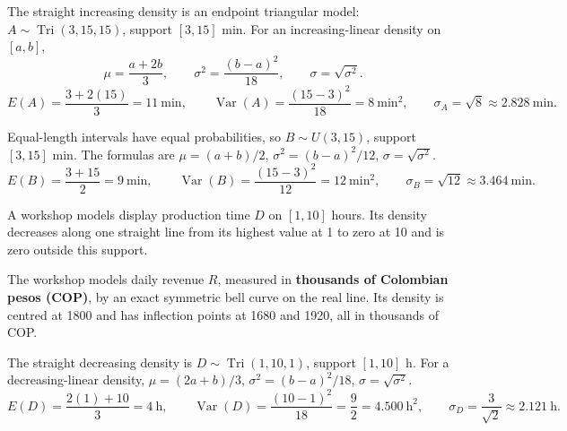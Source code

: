 
The straight increasing density is an endpoint triangular model:
$A\sim\operatorname{Tri}(3,15,15)$, support $[3,15]$ min.
For an increasing-linear density on $[a,b]$,
\[\mu=\frac{a+2b}{3},\qquad \sigma^2=\frac{(b-a)^2}{18},\qquad\sigma=\sqrt{\sigma^2}.\]
\[E(A)=\frac{3+2(15)}3=11\ \text{min},\qquad
\operatorname{Var}(A)=\frac{(15-3)^2}{18}=8\ \text{min}^2,\qquad
\sigma_A=\sqrt8\approx2.828\ \text{min}.\]

Equal-length intervals have equal probabilities, so $B\sim U(3,15)$, support $[3,15]$ min.
The formulas are $\mu=(a+b)/2$, $\sigma^2=(b-a)^2/12$, $\sigma=\sqrt{\sigma^2}$.
\[E(B)=\frac{3+15}{2}=9\ \text{min},\qquad
\operatorname{Var}(B)=\frac{(15-3)^2}{12}=12\ \text{min}^2,\qquad
\sigma_B=\sqrt{12}\approx3.464\ \text{min}.\]

A workshop models display production time $D$ on $[1,10]$ hours. Its density decreases along one straight line from its highest value at 1 to zero at 10 and is zero outside this support.

The workshop models daily revenue $R$, measured in \textbf{thousands of Colombian pesos (COP)}, by an exact symmetric bell curve on the real line. Its density is centred at 1800 and has inflection points at 1680 and 1920, all in thousands of COP.


The straight decreasing density is $D\sim\operatorname{Tri}(1,10,1)$, support $[1,10]$ h.
For a decreasing-linear density, $\mu=(2a+b)/3$, $\sigma^2=(b-a)^2/18$, $\sigma=\sqrt{\sigma^2}$.
\[E(D)=\frac{2(1)+10}{3}=4\ \text{h},\qquad
\operatorname{Var}(D)=\frac{(10-1)^2}{18}=\frac92=4.500\ \text{h}^2,\qquad
\sigma_D=\frac3{\sqrt2}\approx2.121\ \text{h}.\]

